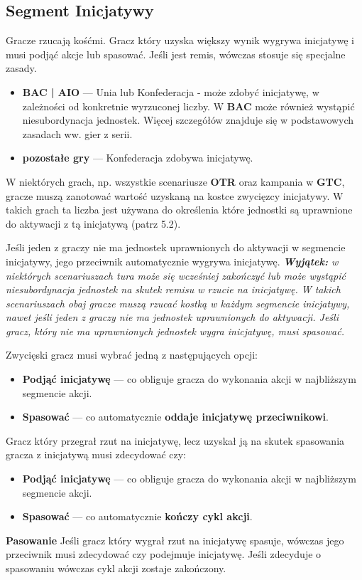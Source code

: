 \subsection{Segment Inicjatywy}
Gracze rzucają kośćmi. Gracz który uzyska większy wynik wygrywa inicjatywę i musi podjąć akcje lub spasować.
Jeśli jest remis, wówczas stosuje się specjalne zasady.
\begin{itemize}
  \item \textbf{BAC | AIO} ---
        Unia lub Konfederacja - może zdobyć inicjatywę, w zależności od konkretnie wyrzuconej liczby.
        W \textbf{BAC} może również wystąpić niesubordynacja jednostek.
        Więcej szczegółów znajduje się w podstawowych zasadach ww. gier z serii.
  \item \textbf{pozostałe gry} --- Konfederacja zdobywa inicjatywę.
\end{itemize}
W niektórych grach, np. wszystkie scenariusze \textbf{OTR} oraz kampania w \textbf{GTC}, gracze muszą zanotować wartość uzyskaną na kostce zwycięzcy inicjatywy. W takich grach ta liczba jest używana do określenia które jednostki są uprawnione do aktywacji z tą inicjatywą (patrz 5.2).\par
Jeśli jeden z graczy nie ma jednostek uprawnionych do aktywacji w segmencie inicjatywy, jego przeciwnik automatycznie wygrywa inicjatywę. \textit{\textbf{Wyjątek:} w niektórych scenariuszach tura może się wcześniej zakończyć lub może wystąpić niesubordynacja jednostek na skutek remisu w rzucie na inicjatywę. W takich scenariuszach obaj gracze muszą rzucać kostką w każdym segmencie inicjatywy, nawet jeśli jeden z graczy nie ma jednostek uprawnionych do aktywacji. Jeśli gracz, który nie ma uprawnionych jednostek wygra inicjatywę, musi spasować.}\par Zwycięski gracz musi wybrać jedną z następujących opcji:
\begin{itemize}
  \item \textbf{Podjąć inicjatywę} --- co obliguje gracza do wykonania akcji w najbliższym segmencie akcji.
  \item \textbf{Spasować} --- co automatycznie \textbf{oddaje inicjatywę przeciwnikowi}.
\end{itemize}
Gracz który przegrał rzut na inicjatywę, lecz uzyskał ją na skutek spasowania gracza z inicjatywą musi zdecydować czy:
\begin{itemize}
  \item \textbf{Podjąć inicjatywę} --- co obliguje gracza do wykonania akcji w najbliższym segmencie akcji.
  \item \textbf{Spasować} --- co automatycznie \textbf{kończy cykl akcji}.
\end{itemize}
\textbf{Pasowanie} Jeśli gracz który wygrał rzut na inicjatywę spasuje, wówczas jego przeciwnik musi zdecydować czy podejmuje inicjatywę. Jeśli zdecyduje o spasowaniu wówczas cykl akcji zostaje zakończony.
